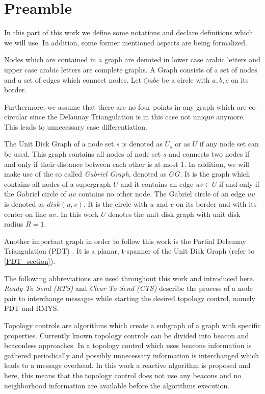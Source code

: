 \section{Preamble}
In this part of this work we define some notations and declare definitions which we will use.
In addition, some former mentioned aspects are being formalized.

Nodes which are contained in a graph are denoted in lower case arabic letters and upper case arabic letters are complete graphs.
A Graph consists of a set of nodes and a set of edges which connect nodes.
Let $\bigcirc{abc} $ be a circle with $a, b, c $ on its border.

Furthermore, we assume that there are no four points in any graph which are co-circular since the Delaunay Triangulation is in this case not unique anymore.
This leads to unnecessary case differentiation.

The Unit Disk Graph of a node set $s $ is denoted as $U_s $ or as $U $ if any node set can be used.
This graph contains all nodes of node set $s $ and connects two nodes if and only if their distance between each other is at most $1 $.
In addition, we will make use of the so called \emph{Gabriel Graph}, denoted as $GG $. 
It is the graph which contains all nodes of a supergraph $U $ and it contains an edge $uv \in U $ if and only if the Gabriel circle of $uv $ contains no other node.
The Gabriel circle of an edge $uv $ is denoted as $disk(u, v) $.
It is the circle with $u $ and $v $ on its border and with its center on line $uv $. 
In this work $U $ denotes the unit disk graph with unit disk radius $R = 1 $.

Another important graph in order to follow this work is the Partial Delaunay Triangulation (PDT)  \cite{pdt}. It is a planar, t-spanner of the Unit Disk Graph (refer to \ref{PDT_section}).

The following abbreviations are used throughout this work and introduced here.
\emph{Ready To Send (RTS)} and \emph{Clear To Send (CTS)} describe the process of a node pair to interchange messages while starting the desired topology control, namely PDT and RMYS.

Topology controls are algorithms which create a subgraph of a graph with specific properties.
Currently known topology controls can be divided into beacon and beaconless approaches.
In a topology control which uses beacons information is gathered periodically and possibly unnecessary information is interchanged which leads to a message overhead.
In this work a reactive algorithm is proposed and here, this means that the topology control does not use any beacons and no neighborhood information are available before the algorithms execution.




